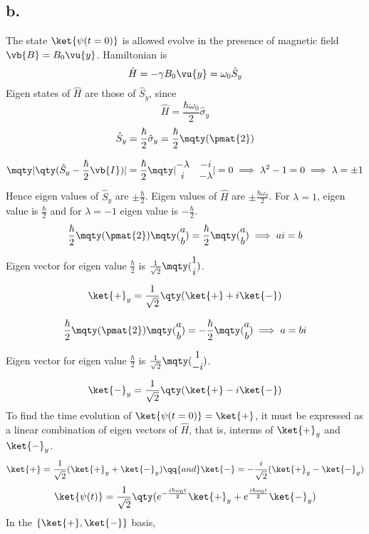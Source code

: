 \subsection*{b.}
The state $\ket{\psi(t=0)}$ is allowed evolve in the presence of magnetic field $\vb{B}=B_0\vu{y}$. Hamiltonian is \[\hat{H}=-\gamma B_0\vu{y}=\omega_0\hat{S}_y\]
Eigen states of $\hat{H}$ are those of $\hat{S}_y$, since \[\hat{H}=\frac{\hbar\omega_0}{2}\hat{\sigma}_y\]
\[\hat{S}_y=\frac{\hbar}{2}\hat{\sigma}_y=\frac{\hbar}{2}\mqty(\pmat{2})\]

\[\mqty|\qty(\hat{S}_y-\frac{\hbar}{2}\vb{I})|=\frac{\hbar}{2}\mqty|\begin{matrix}-\lambda & -i \\ i& -\lambda\end{matrix}|=0\implies\lambda^2-1=0\implies\lambda=\pm 1\]
Hence eigen values of $\hat{S}_y$ are $\pm\frac{\hbar}{2}$. Eigen values of $\hat{H}$ are $\pm\frac{\hbar\omega_0}{2}$.
For $\lambda=1$, eigen value is $\frac{\hbar}{2}$ and for $\lambda=-1$ eigen value is $-\frac{\hbar}{2}$.
\[\frac{\hbar}{2}\mqty(\pmat{2})\mqty(\begin{matrix}a\\b\end{matrix})=\frac{\hbar}{2}\mqty(\begin{matrix}a\\b\end{matrix})\implies ai=b\]
Eigen vector for eigen value $\frac{\hbar}{2}$ is $\frac{1}{\sqrt{2}}\mqty(\begin{matrix}1\\i\end{matrix})$.
\[\ket{+}_y=\frac{1}{\sqrt{2}}\qty(\ket{+}+i\ket{-})\]

\[\frac{\hbar}{2}\mqty(\pmat{2})\mqty(\begin{matrix}a\\b\end{matrix})=-\frac{\hbar}{2}\mqty(\begin{matrix}a\\b\end{matrix})\implies a=bi\]
Eigen vector for eigen value $\frac{\hbar}{2}$ is $\frac{1}{\sqrt{2}}\mqty(\begin{matrix}1\\-i\end{matrix})$.
\[\ket{-}_y=\frac{1}{\sqrt{2}}\qty(\ket{+}-i\ket{-})\]
To find the time evolution of $\ket{\psi(t=0)}=\ket{+}$, it must be expressed as a linear combination of eigen vectors of $\hat{H}$, that is, interms of $\ket{+}_y$ and $\ket{-}_y$.
\[\ket{+}=\frac{1}{\sqrt{2}}(\ket{+}_y+\ket{-}_y)\qq{and}\ket{-}=-\frac{i}{\sqrt{2}}(\ket{+}_y-\ket{-}_y)\]
\[\ket{\psi(t)}=\frac{1}{\sqrt{2}}\qty(e^{-\frac{i\hbar\omega_0 t}{2}}\ket{+}_y+e^{\frac{i\hbar\omega_0 t}{2}}\ket{-}_y)\]
In the $\{\ket{+},\ket{-}\}$ basis, 


